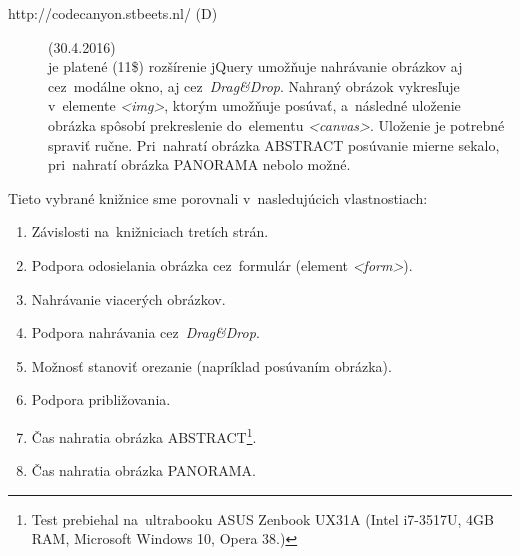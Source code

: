 \begin{description}
	
	\item[http://codecanyon.stbeets.nl/ (D)](30.4.2016)\\
	je platené (11\$) rozšírenie jQuery umožňuje nahrávanie obrázkov aj cez~modálne okno, aj cez~\emph{Drag\&Drop}. Nahraný obrázok vykresľuje v~elemente \emph{<img>}, ktorým umožňuje posúvať, a~následné uloženie obrázka spôsobí prekreslenie do~elementu \emph{<canvas>}. Uloženie je potrebné spraviť ručne. Pri~nahratí obrázka ABSTRACT posúvanie mierne sekalo, pri~nahratí obrázka PANORAMA nebolo možné.

\end{description}

Tieto vybrané knižnice sme porovnali v~nasledujúcich vlastnostiach:
\begin{enumerate}
	\item Závislosti na~knižniciach tretích strán.
	\item Podpora odosielania obrázka cez~formulár (element \emph{<form>}).
	\item Nahrávanie viacerých obrázkov.
	\item Podpora nahrávania cez~\emph{Drag\&Drop}.
	\item Možnosť stanoviť orezanie (napríklad posúvaním obrázka).
	\item Podpora približovania.
	\item Čas nahratia obrázka ABSTRACT\footnote{Test prebiehal na~ultrabooku ASUS Zenbook UX31A (Intel i7-3517U, 4GB RAM, Microsoft Windows 10, Opera 38.) }.
	\item Čas nahratia obrázka PANORAMA\footnotemark[\value{footnote}].
\end{enumerate}

